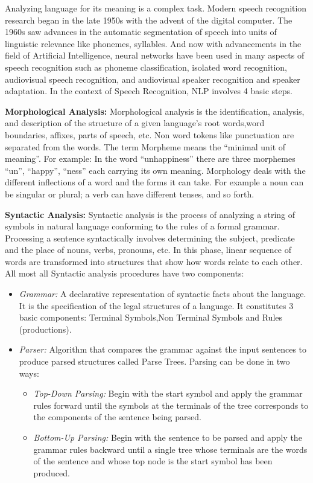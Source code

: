 \documentclass[sigconf]{acmart}
\begin{document}
Analyzing language for its meaning is a complex task. Modern speech recognition research began in the late 1950s with the advent of the digital computer. The 1960s saw advances in the automatic segmentation of speech into units of linguistic relevance like phonemes, syllables. And now with advancements in the field of Artificial Intelligence, neural networks have been used in many aspects of speech recognition such as phoneme classification, isolated word recognition, audiovisual speech recognition, and audiovisual speaker recognition and speaker adaptation. In the context of Speech Recognition, NLP involves 4 basic steps.
\par\null\par
\textbf{Morphological Analysis:}
     Morphological analysis is the identification, analysis, and description of the structure of a given language's root words,word boundaries, affixes, parts of speech, etc. Non word tokens like punctuation are separated from the words. The term Morpheme means the ``minimal unit of meaning''. For example: In the  word ``unhappiness'' there are three morphemes ``un'', ``happy'', ``ness'' each carrying its own meaning. Morphology deals with the different inflections of a word and the forms it can take. For example a noun can be singular or plural; a verb can have different tenses, and so forth. 
\par\null\par
\textbf{Syntactic Analysis:}
     Syntactic analysis is the process of analyzing a string of symbols in natural language conforming to the rules of a formal grammar. Processing a sentence syntactically involves determining the subject, predicate and the place of nouns, verbs, pronouns, etc. In this phase, linear sequence of words are transformed into structures that show how words relate to each other. All most all Syntactic analysis procedures have two components:
     \begin{itemize}
     \item\textit{Grammar:} A declarative representation of syntactic facts about the language. It is the specification of the legal structures of a language. It constitutes 3 basic components: Terminal Symbols,Non Terminal Symbols and Rules (productions).
     \item\textit{Parser:} Algorithm that compares the grammar against the input sentences to produce parsed structures called Parse Trees. Parsing can be done in two ways:
      \begin{itemize}
      \item\textit{Top-Down Parsing:} Begin with the start symbol and apply the grammar rules forward until the   symbols at the terminals of the tree corresponds to the components of the sentence being parsed. 
      \item\textit{Bottom-Up Parsing:} Begin with the sentence to be parsed and apply the grammar rules  
backward until a single tree whose terminals are the words of the sentence and whose top node is the start symbol has been produced. 
      \end{itemize}
     \end{itemize}
\end{document}
